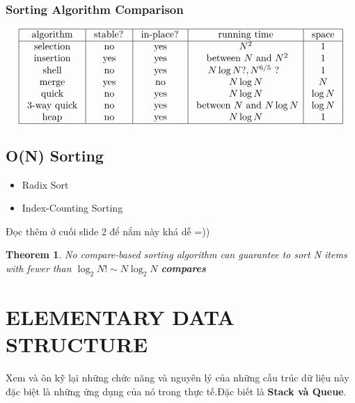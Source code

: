 \documentclass{article}
\newtheorem*{theorem}{Theorem}
\begin{document}
\subsubsection{Sorting Algorithm Comparison}
\begin{equation}
\begin{array}{|c|c|c|c|c|}
\hline \text { algorithm } & \text { stable? } & \text { in-place? } & \text { running time } & \text { space } \\
\hline \text { selection } & \text { no } & \text { yes } & N^{2} & 1 \\
\text { insertion } & \text { yes } & \text { yes } & \text { between } N \text { and } N^{2} & 1 \\
\text { shell } & \text { no } & \text { yes } & N \log N ?, N^{6 / 5} \text { ? } & 1 \\
\text { merge } & \text { yes } & \text { no } & N \log N & N \\
\text { quick } & \text { no } & \text { yes } & N \log N & \log N \\
\text { 3-way quick } & \text { no } & \text { yes } & \text { between } N \text { and } N \log N & \log N \\
\text { heap } & \text { no } & \text { yes } & N \log N & 1 \\
\hline
\end{array}
\end{equation}

\subsection{O(N) Sorting}
\begin{itemize}
    \item Radix Sort
    \item Index-Counting Sorting 
\end{itemize}

Đọc thêm ở cuối slide 2 để nắm này khá dễ =))

\begin{theorem}
    No compare-based sorting algorithm can guarantee to sort N items with fewer than $\log_2{N!} \sim N\log_2{N}$ \textbf{compares}
\end{theorem}
\section{ELEMENTARY DATA STRUCTURE}
Xem và ôn kỹ lại những chức năng và nguyên lý của những cấu trúc dữ liệu này đặc biệt là những ứng dụng của nó trong thực tế.Đặc biết là \textbf{Stack và Queue}.
\end{document}
